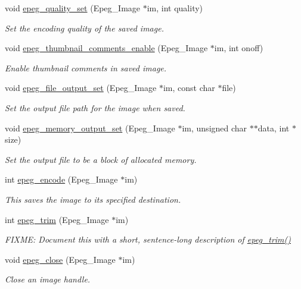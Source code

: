 \begin{DoxyCompactItemize}
void \hyperlink{epeg_8c_ad0c11f61561f622ca4097c47c75129bc}{epeg\+\_\+quality\+\_\+set} (Epeg\+\_\+\+Image $\ast$im, int quality)
\begin{DoxyCompactList}\small\item\em Set the encoding quality of the saved image. \end{DoxyCompactList}\item 
void \hyperlink{epeg_8c_a5cfe689f77dbe7b120317a195585ee51}{epeg\+\_\+thumbnail\+\_\+comments\+\_\+enable} (Epeg\+\_\+\+Image $\ast$im, int onoff)
\begin{DoxyCompactList}\small\item\em Enable thumbnail comments in saved image. \end{DoxyCompactList}\item 
void \hyperlink{epeg_8c_a4aa4c7bbf3edf1f24603d3b4dad684b4}{epeg\+\_\+file\+\_\+output\+\_\+set} (Epeg\+\_\+\+Image $\ast$im, const char $\ast$file)
\begin{DoxyCompactList}\small\item\em Set the output file path for the image when saved. \end{DoxyCompactList}\item 
void \hyperlink{epeg_8c_ae0e91c160074e6d96b7e366fb0eb6ec8}{epeg\+\_\+memory\+\_\+output\+\_\+set} (Epeg\+\_\+\+Image $\ast$im, unsigned char $\ast$$\ast$data, int $\ast$size)
\begin{DoxyCompactList}\small\item\em Set the output file to be a block of allocated memory. \end{DoxyCompactList}\item 
int \hyperlink{epeg_8c_a12a018084510ebdc0e627f56305fea79}{epeg\+\_\+encode} (Epeg\+\_\+\+Image $\ast$im)
\begin{DoxyCompactList}\small\item\em This saves the image to its specified destination. \end{DoxyCompactList}\item 
int \hyperlink{epeg_8c_a327dab144744ba5f1892643d627e6df0}{epeg\+\_\+trim} (Epeg\+\_\+\+Image $\ast$im)
\begin{DoxyCompactList}\small\item\em F\+I\+X\+M\+E\+: Document this with a short, sentence-\/long description of \hyperlink{epeg_8c_a327dab144744ba5f1892643d627e6df0}{epeg\+\_\+trim()} \end{DoxyCompactList}\item 
void \hyperlink{epeg_8c_a8faf0f0fab47ac97b86ee7e00e1bee7c}{epeg\+\_\+close} (Epeg\+\_\+\+Image $\ast$im)
\begin{DoxyCompactList}\small\item\em Close an image handle. \end{DoxyCompactList}\end{DoxyCompactItemize}


